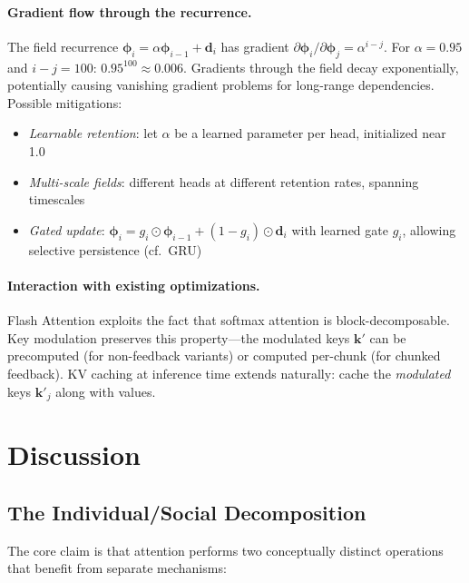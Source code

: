 \documentclass[11pt,a4paper]{article}
\newcommand{\field}{\bm{\phi}}
\newcommand{\retain}{\alpha}
\newcommand{\K}{\bm{k}}
\begin{document}
\paragraph{Gradient flow through the recurrence.}
The field recurrence $\field_i = \retain \field_{i-1} + \bm{d}_i$
has gradient $\partial \field_i / \partial \field_j = \retain^{i-j}$.
For $\retain = 0.95$ and $i - j = 100$: $0.95^{100} \approx 0.006$.
Gradients through the field decay exponentially, potentially causing
vanishing gradient problems for long-range dependencies.  Possible
mitigations:
\begin{itemize}
    \item \emph{Learnable retention}: let $\retain$ be a learned
          parameter per head, initialized near 1.0
    \item \emph{Multi-scale fields}: different heads at different
          retention rates, spanning timescales
    \item \emph{Gated update}: $\field_i = g_i \odot \field_{i-1}
          + (1 - g_i) \odot \bm{d}_i$ with learned gate $g_i$,
          allowing selective persistence (cf.\ GRU)
\end{itemize}

\paragraph{Interaction with existing optimizations.}
Flash Attention exploits the fact that softmax attention is
block-decomposable.  Key modulation preserves this property---the
modulated keys $\K'$ can be precomputed (for non-feedback variants)
or computed per-chunk (for chunked feedback).  KV caching at
inference time extends naturally: cache the \emph{modulated} keys
$\K'_j$ along with values.


\section{Discussion}
\label{sec:discussion}

\subsection{The Individual/Social Decomposition}

The core claim is that attention performs two conceptually distinct
operations that benefit from separate mechanisms:
\end{document}
